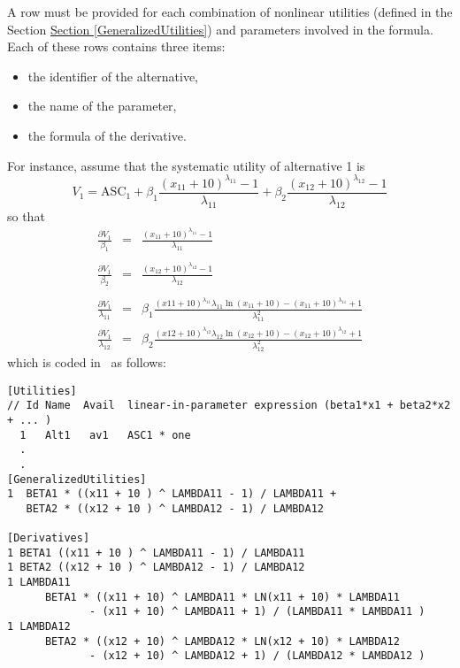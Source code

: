 \documentclass[12pt]{memoir}
\begin{document}
\begin{description}
A row must be provided for each
combination of nonlinear utilities (defined in the Section
\hyperlink{GeneralizedUtilities}{Section [GeneralizedUtilities]}) and
parameters involved in the formula. Each of these rows contains three
items:
\begin{itemize}
\item the identifier of the alternative,
\item the name of the parameter,
\item the formula of the derivative.
\end{itemize}

For instance, assume that the systematic utility of alternative 1 is 
\[
V_1 = \text{ASC}_1 + \beta_1 \frac{(x_{11} + 10 )^{\lambda_{11}} - 1}{\lambda_{11}} + \beta_2  \frac{(x_{12} + 10 )^{\lambda_{12}} - 1}{\lambda_{12}}
\]
so that
\[
\begin{array}{rcl}
\displaystyle\frac{\partial V_1}{\beta_1} &=&  \displaystyle\frac{(x_{11} + 10 )^{\lambda_{11}} - 1}{\lambda_{11}}\\&&\\
\displaystyle\frac{\partial V_1}{\beta_2} &=&   \displaystyle\frac{(x_{12} + 10 )^{\lambda_{12}} - 1}{\lambda_{12}} \\&&\\
\displaystyle\frac{\partial V_1}{\lambda_{11}} &=&  \displaystyle\beta_1 \frac{(x11 + 10)^{\lambda_{11}} \lambda_{11}   \ln(x_{11} + 10)  
             - (x_{11} + 10)^{\lambda_{11}} + 1}{\lambda^2_{11}} \\
\displaystyle\frac{\partial V_1}{\lambda_{12}} &=&  \displaystyle\beta_2 \frac{(x12 + 10)^{\lambda_{12}} \lambda_{12}   \ln(x_{12} + 10)  
             - (x_{12} + 10)^{\lambda_{12}} + 1}{\lambda^2_{12}}
         \end{array}
\]
which is coded in \BIOGEME\ as follows: 
{\footnotesize \begin{verbatim}
[Utilities]
// Id Name  Avail  linear-in-parameter expression (beta1*x1 + beta2*x2 + ... )
  1   Alt1   av1   ASC1 * one 
  .
  .
[GeneralizedUtilities]
1  BETA1 * ((x11 + 10 ) ^ LAMBDA11 - 1) / LAMBDA11 + 
   BETA2 * ((x12 + 10 ) ^ LAMBDA12 - 1) / LAMBDA12

[Derivatives]
1 BETA1 ((x11 + 10 ) ^ LAMBDA11 - 1) / LAMBDA11
1 BETA2 ((x12 + 10 ) ^ LAMBDA12 - 1) / LAMBDA12
1 LAMBDA11 
      BETA1 * ((x11 + 10) ^ LAMBDA11 * LN(x11 + 10) * LAMBDA11 
             - (x11 + 10) ^ LAMBDA11 + 1) / (LAMBDA11 * LAMBDA11 )
1 LAMBDA12 
      BETA2 * ((x12 + 10) ^ LAMBDA12 * LN(x12 + 10) * LAMBDA12 
             - (x12 + 10) ^ LAMBDA12 + 1) / (LAMBDA12 * LAMBDA12 )
\end{verbatim}
}



\end{description}
\end{document}

